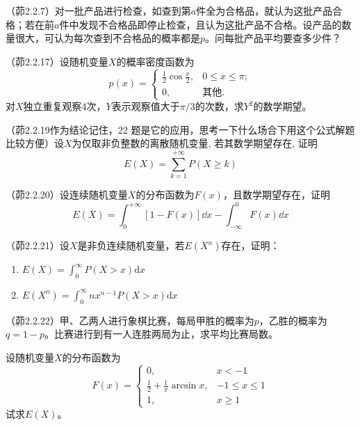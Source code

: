 \begin{problemset}[错题记录]
    \item （茆2.2.7）对一批产品进行检查，如查到第$a$件全为合格品，就认为这批产品合格；若在前$a$件中发现不合格品即停止检查，且认为这批产品不合格。设产品的数量很大，可认为每次查到不合格品的概率都是$p$。问每批产品平均要查多少件？
    \item （茆2.2.17）设随机变量$X$的概率密度函数为
    \[ p(x)=\begin{cases}
            \frac{1}{2} \cos \frac{x}{2}, & 0 \leq x \leq \pi; \\
            0,                            & \text{其他}.
        \end{cases} \]
    对$X$独立重复观察4次，$Y$表示观察值大于$\pi/3$的次数，求$Y^2$的数学期望。
    \item （茆2.2.19作为结论记住，22 题是它的应用，思考一下什么场合下用这个公式解题比较方便）设$X$为仅取非负整数的离散随机变量, 若其数学期望存在, 证明
    \[ E(X) = \sum_{k=1}^{+\infty}P(X \ge k) \]
    \item （茆2.2.20）设连续随机变量$X$的分布函数为$F(x)$，且数学期望存在，证明
    \[ E(X) = \int_{0}^{+\infty}[1-F(x)] \dd  x-\int_{-\infty}^{0} F(x) \dd  x \]
    \item （茆2.2.21）设$X$是非负连续随机变量，若$E(X^n)$存在，证明：\begin{enumerate}
        \item $E(X)=\int_0^{\infty}P(X>x) \mathrm{d}x$
        \item $E(X^n)=\int_0^{\infty}n x^{n-1}P(X>x) \mathrm{d}x$
    \end{enumerate}
    \item （茆2.2.22）甲、乙两人进行象棋比赛，每局甲胜的概率为$p$，乙胜的概率为$q=1-p$。比赛进行到有一人连胜两局为止，求平均比赛局数。
    \item 设随机变量$X$的分布函数为
    \[ F(x)=\begin{cases}
            0,                                  & x<-1         \\
            \frac{1}{2}+\frac{1}{\pi}\arcsin x, & -1\le x\le 1 \\
            1,                                  & x\ge 1
        \end{cases} \]
    试求$E(X)$。
\end{problemset}
